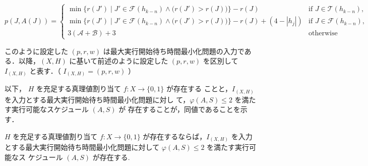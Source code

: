 \documentclass[12pt]{optlab-bachelor}
\begin{document}
{\small
$$p(J,A(J)) = \left\{ \begin{array}{lll} \min \big\{r(J') \mid
J' \in \mathcal{F}(h_{k - n}) \wedge \big(r(J') > r(J) \big) \big\} - r(J)
& \text{if } J \in \mathcal{T}(h_{k - n}), \\ \min \big\{r(J') \mid
J' \in \mathcal{F}(h_{k - n}) \wedge \big(r(J') > r(J) \big) \big\} - r(J)
+ (4 - |h_j|) & \text{if } J \in \mathcal{F}(h_{k - n}), \\ 3(\mathcal{A} + \mathcal{B}) + 3 & \text{otherwise}\end{array} \right.$$
}

このように設定した $(p,r,w)$ は最大実行開始待ち時間最小化問題の入力である．以降，$(X,H)$ に基いて前述のように設定した $(p,r,w)$ を区別して $I_{(X,H)}$ と表す．（ $I_{(X,H)} = (p,r,w)$ ）

以下， $H$ を充足する真理値割り当て $f : X \to \{0,1\}$ が存在する
ことと，$I_{(X,H)}$ を入力とする最大実行開始待ち時間最小化問題に対し
て，$\varphi(A,S) \le 2$ を満たす実行可能なスケジュール $(A,S)$ が
存在することが，同値であることを示す．

\begin{lemma}\label{l_5}
  $H$ を充足する真理値割り当て $f : X \to \{0,1\}$ が存在するならば，$I_{(X,H)}$ を入力とする最大実行開始待ち時間最小化問題に対して
  $\varphi(A, S) \le 2$ を満たす実行可能なス
  ケジュール $(A, S)$ が存在する.
\end{lemma}
\end{document}
